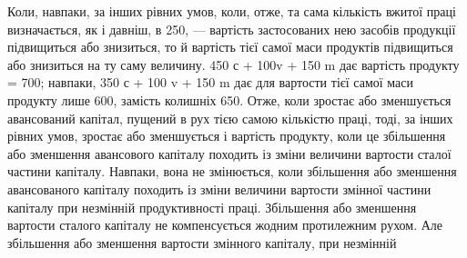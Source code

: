 Коли, навпаки, за інших рівних умов, коли, отже, та сама кількість
вжитої праці визначається, як і давніш, в 250, — вартість застосованих нею
засобів продукції підвищиться або знизиться, то й вартість тієї самої маси продуктів
підвищиться або знизиться на ту саму величину. 450 с + 100v + 150  m
дає вартість продукту = 700; навпаки, 350 с + 100 v + 150 m дає для вартости
тієї самої маси продукту лише 600, замість колишніх 650. Отже, коли зростає
або зменшується авансований капітал, пущений в рух тією самою кількістю
праці, тоді, за інших рівних умов, зростає або зменшується і вартість продукту,
коли це збільшення або зменшення авансового капіталу походить із зміни
величини вартости сталої частини капіталу. Навпаки, вона не змінюється, коли
збільшення або зменшення авансованого капіталу походить із зміни величини
вартости змінної частини капіталу при незмінній продуктивності праці. Збільшення
або зменшення вартости сталого капіталу не компенсується жодним протилежним
рухом. Але збільшення або зменшення вартости змінного капіталу, при незмінній
\parbreak{}  %
